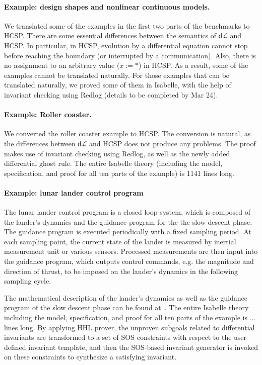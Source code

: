 \documentclass[runningheads,a4paper]{llncs}
\newcommand{\dL}{\mathsf{d}\mathcal{L}}
\begin{document}
\paragraph{Example: design shapes and nonlinear continuous models.}

We translated some of the examples in the first two parts of the
benchmarks to HCSP. There are some essential differences between the
semantics of $\dL$ and HCSP. In particular, in HCSP, evolution by a
differential equation cannot stop before reaching the boundary (or
interrupted by a communication). Also, there is no assignment to an
arbitrary value ($x := *$) in HCSP. As a result, some of the examples
cannot be translated naturally. For those examples that can be
translated naturally, we proved some of them in Isabelle, with the
help of invariant checking using Redlog (details to be completed by
Mar 24).

\paragraph{Example: Roller coaster.}

We converted the roller coaster example \cite{coasterx} to HCSP. The
conversion is natural, as the differences between $\dL$ and HCSP does
not produce any problems. The proof makes use of invariant checking
using Redlog, as well as the newly added differential ghost rule. The
entire Isabelle theory (including the model, specification, and proof
for all ten parts of the example) is 1141 lines long.

\paragraph{Example: lunar lander control program}
The lunar lander control program is a closed loop system, which is composed of the lander's dynamics and the guidance program for the the slow descent phase. The guidance program is executed periodically with a fixed sampling period. At each sampling point, the current state of the lander is measured by inertial measurement unit or various sensors. Processed measurements are then input into the guidance program, which outputs control commands, e.g. the magnitude and direction of thrust, to be imposed on the lander's dynamics in the following sampling cycle.

The mathematical description of the lander's dynamics as well as the guidance program of the slow descent phase can be found at~\cite{ZYZG14,ZhanWZ16}.  The entire Isabelle theory including the model, specification, and proof for all ten parts of the example is ... lines long.  By applying HHL prover, the unproven subgoals related to differential invariants are transformed to a set of SOS constraints with respect to the user-defined invariant template, and then the SOS-based invariant generator is invoked on these constraints to synthesize a satisfying invariant.





\end{document}
